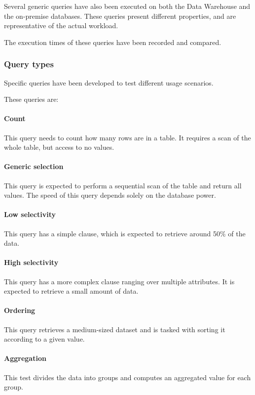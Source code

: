 Several generic queries have also been executed on both the Data Warehouse and the on-premise databases.
These queries present different properties, and are representative of the actual workload.

The execution times of these queries have been recorded and compared.

\subsubsection{Query types}
    Specific queries have been developed to test different usage scenarios.
    
    These queries are:
    \paragraph{Count}
        This query needs to count how many rows are in a table.
        It requires a scan of the whole table, but access to no values.
    
    \paragraph{Generic selection}
        This query is expected to perform a sequential scan of the table and return all values.
        The speed of this query depends solely on the database power.
        
    \paragraph{Low selectivity}
        This query has a simple  clause, which is expected to retrieve around 50\% of the data.
        
    \paragraph{High selectivity}
        This query has a more complex  clause ranging over multiple attributes.
        It is expected to retrieve a small amount of data.
        
    \paragraph{Ordering}
        This query retrieves a medium-sized dataset and is tasked with sorting it according to a given value.
        
    \paragraph{Aggregation}
        This test divides the data into groups and computes an aggregated value for each group.
        
